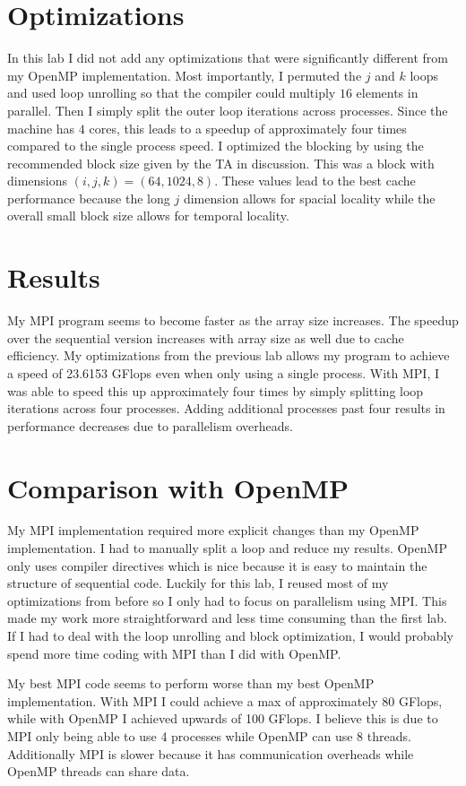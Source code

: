 \documentclass[12pt]{article}
\begin{document}
\section{Optimizations}

In this lab I did not add any optimizations that were significantly different from my OpenMP implementation.
Most importantly, I permuted the \(j\) and \(k\) loops and used loop unrolling so that the compiler could
multiply \(16\) elements in parallel. Then I simply split the outer loop iterations across processes. Since
the machine has \(4\) cores, this leads to a speedup of approximately four times compared to the single process speed.
I optimized the blocking by using the recommended block size given by the TA in discussion. This was a block
with dimensions \((i,j,k) = (64, 1024, 8)\). These values lead to the best cache performance because the long \(j\) dimension
allows for spacial locality while the overall small block size allows for temporal locality.

\section{Results}

My MPI program seems to become faster as the array size increases. The speedup over the sequential version increases
with array size as well due to cache efficiency. My optimizations from the previous lab allows my program to achieve a speed
of 23.6153 GFlops even when only using a single process. With MPI, I was able to speed this up approximately four times by
simply splitting loop iterations across four processes. Adding additional processes past four results in performance decreases
due to parallelism overheads.

\section{Comparison with OpenMP}

My MPI implementation required more explicit changes than my OpenMP implementation. I had to manually split a loop
and reduce my results. OpenMP only uses compiler directives which is nice because it is easy to maintain the structure of
sequential code. Luckily for this lab, I reused most of my optimizations from before so I only had to focus on parallelism using
MPI. This made my work more straightforward and less time consuming than the first lab. If I had to deal with the loop unrolling
and block optimization, I would probably spend more time coding with MPI than I did with OpenMP.

My best MPI code seems to perform worse than my best OpenMP implementation. With MPI I could achieve a max of approximately 80 GFlops,
while with OpenMP I achieved upwards of 100 GFlops. I believe this is due to MPI only being able to use 4 processes while
OpenMP can use 8 threads. Additionally MPI is slower because it has communication overheads while OpenMP threads can share data.
\end{document}
